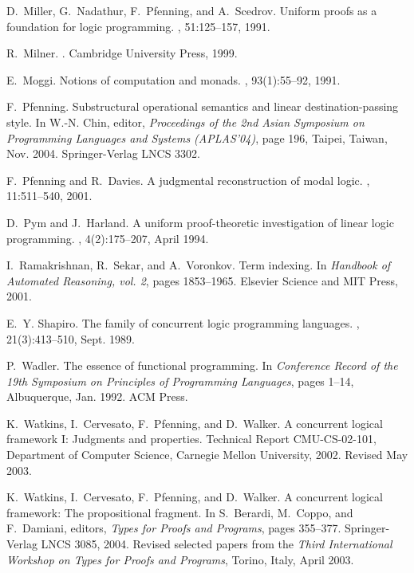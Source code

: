 \documentclass{sig-alt}
\begin{document}
\begin{thebibliography}{50}
D.~Miller, G.~Nadathur, F.~Pfenning, and A.~Scedrov.
\newblock Uniform proofs as a foundation for logic programming.
, 51:125--157, 1991.

R.~Milner.
.
\newblock Cambridge University Press, 1999.

E.~Moggi.
\newblock Notions of computation and monads.
, 93(1):55--92, 1991.

F.~Pfenning.
\newblock Substructural operational semantics and linear destination-passing
  style.
\newblock In W.-N. Chin, editor, {\em Proceedings of the 2nd Asian Symposium on
  Programming Languages and Systems (APLAS'04)}, page 196, Taipei, Taiwan, Nov.
  2004. Springer-Verlag LNCS 3302.

F.~Pfenning and R.~Davies.
\newblock A judgmental reconstruction of modal logic.
, 11:511--540, 2001.

D.~Pym and J.~Harland.
\newblock A uniform proof-theoretic investigation of linear logic programming.
, 4(2):175--207, April 1994.

I.~Ramakrishnan, R.~Sekar, and A.~Voronkov.
\newblock Term indexing.
\newblock In {\em Handbook of Automated Reasoning, vol. 2}, pages 1853--1965.
  Elsevier Science and MIT Press, 2001.

E.~Y. Shapiro.
\newblock The family of concurrent logic programming languages.
, 21(3):413--510, Sept. 1989.

P.~Wadler.
\newblock The essence of functional programming.
\newblock In {\em Conference Record of the 19th Symposium on Principles of
  Programming Languages}, pages 1--14, Albuquerque, Jan. 1992. ACM Press.

K.~Watkins, I.~Cervesato, F.~Pfenning, and D.~Walker.
\newblock A concurrent logical framework {I}: Judgments and properties.
\newblock Technical Report CMU-CS-02-101, Department of Computer Science,
  Carnegie Mellon University, 2002.
\newblock Revised May 2003.

K.~Watkins, I.~Cervesato, F.~Pfenning, and D.~Walker.
\newblock A concurrent logical framework: The propositional fragment.
\newblock In S.~Berardi, M.~Coppo, and F.~Damiani, editors, {\em Types for
  Proofs and Programs}, pages 355--377. Springer-Verlag LNCS 3085, 2004.
\newblock Revised selected papers from the {\em Third International Workshop on
  Types for Proofs and Programs}, Torino, Italy, April 2003.

\end{thebibliography}
\end{document}
